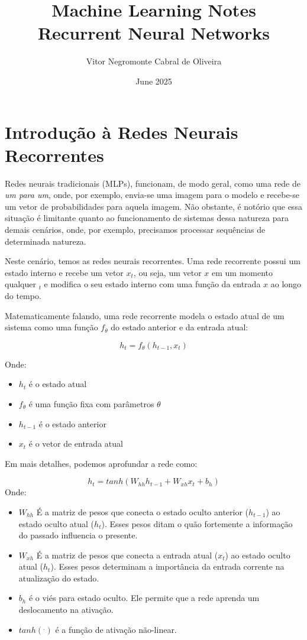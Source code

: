 \documentclass{article}
\title{Machine Learning Notes \\ Recurrent Neural Networks}
\author{Vitor Negromonte Cabral de Oliveira}
\date{June 2025}
\begin{document}
\maketitle

\newpage
\tableofcontents
\newpage
\section{Introdução à Redes Neurais Recorrentes}

Redes neurais tradicionais (MLPs), funcionam, de modo geral, como uma rede de \textit{um para um}, onde, por exemplo, envia-se uma imagem para o modelo e recebe-se um vetor de probabilidades para aquela imagem. Não obstante, é notório que essa situação é limitante quanto ao funcionamento de sistemas dessa natureza para demais cenários, onde, por exemplo, precisamos processar sequências de determinada natureza.

Neste cenário, temos as redes neurais recorrentes. Uma rede recorrente possui um estado interno e recebe um vetor $x_t$, ou seja, um vetor $x$ em um momento qualquer $_t$ e modifica o seu estado interno com uma função da entrada $x$ ao longo do tempo.

Matematicamente falando, uma rede recorrente modela o estado atual de um sistema como uma função $f_{\theta}$ do estado anterior e da entrada atual:

\begin{equation}
    h_t = f_{\theta}(h_{t-1}, x_t)
\end{equation}

Onde:

\begin{itemize}
    \item $h_t$ é o estado atual
    \item $f_{\theta}$ é uma função fixa com parâmetros $\theta$
    \item $h_{t-1}$ é o estado anterior
    \item $x_t$ é o vetor de entrada atual
\end{itemize}

Em mais detalhes, podemos aprofundar a rede como:


\begin{equation}
    h_t = tanh(W_{hh}h_{t-1}+W_{xh}x_{t}+b_h)
\end{equation}
Onde:
\begin{itemize}
    \item $W_{hh}$ É a matriz de pesos que conecta o estado oculto anterior ($h_{t-1}$) ao estado oculto atual ($h_t$). Esses pesos ditam o quão fortemente a informação do passado influencia o presente.
    \item $W_{xh}$ É a matriz de pesos que conecta a entrada atual ($x_t$) ao estado oculto atual ($h_t$). Esses pesos determinam a importância da entrada corrente na atualização do estado.
    \item $b_h$ é o viés para estado oculto. Ele permite que a rede aprenda um deslocamento na ativação.
    \item $tanh(^.)$ é a função de ativação não-linear.
\end{itemize}
\end{document}
